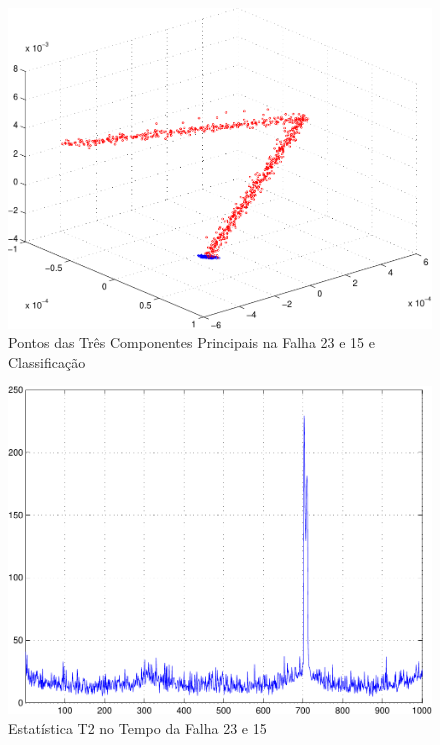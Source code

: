 \documentclass[journal]{IEEEtran}
\begin{document}
\begin{figure}[H]
	\centering
  \includegraphics[scale=0.6]{figs/fault23_15/pontos3D.pdf}
  \caption{Pontos das Três Componentes Principais na Falha 23 e 15 e Classificação}
	\label{fig:f23_15:3d}
\end{figure}

\begin{figure}[H]
	\centering
  \includegraphics[scale=0.6]{figs/fault23_15/T2_tempo.pdf}
  \caption{Estatística T2 no Tempo da Falha 23 e 15}
	\label{fig:f23_15:t2}
\end{figure}


\end{document}
